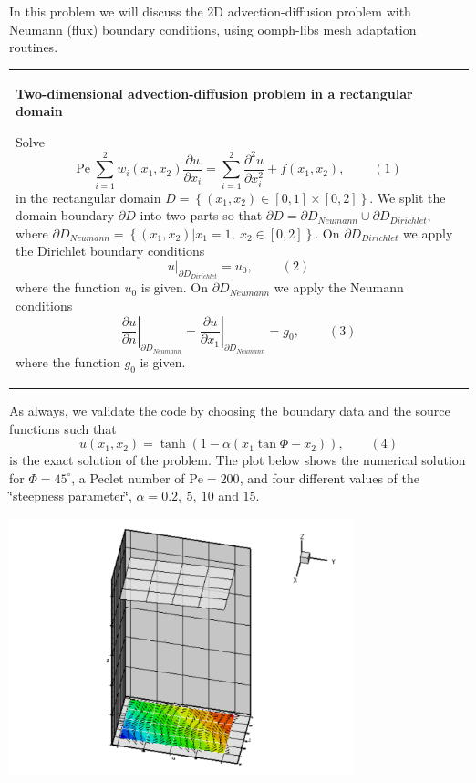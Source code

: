 In this problem we will discuss the 2D advection-\/diffusion problem with Neumann (flux) boundary conditions, using {\ttfamily oomph-\/lib\textquotesingle{}s} mesh adaptation routines.

\begin{center} \tabulinesep=1mm
\begin{longtabu} spread 0pt [c]{*{1}{|X[-1]}|}
\hline
\begin{center} {\bfseries Two-\/dimensional advection-\/diffusion problem in a rectangular domain} \end{center}  Solve \[ \mbox{Pe}\ \sum_{i=1}^2 w_i \left(x_1,x_2 \right) \frac{\partial u}{\partial x_i} = \sum_{i=1}^2 \frac{\partial^2u}{\partial x_i^2} + f(x_1,x_2), \ \ \ \ \ \ \ \ \ \ (1) \] in the rectangular domain $D =\left\{ (x_1,x_2) \in [0,1] \times [0,2]\right\}$. We split the domain boundary $ \partial D $ into two parts so that $ \partial D = \partial D_{Neumann} \cup \partial D_{Dirichlet} $, where $ \partial D_{Neumann} = \left\{ (x_1,x_2) | x_1=1, \ x_2\in [0,2] \right\} $. On $ \partial D_{Dirichlet}$ we apply the Dirichlet boundary conditions \[ \left. u\right|_{\partial D_{Dirichlet}}=u_0, \ \ \ \ \ \ \ \ \ \ (2) \] where the function $ u_0 $ is given. On $ \partial D_{Neumann}$ we apply the Neumann conditions \[ \left. \frac{\partial u}{\partial n}\right|_{\partial D_{Neumann}} = \left. \frac{\partial u}{\partial x_1}\right|_{\partial D_{Neumann}} =g_0, \ \ \ \ \ \ \ \ \ \ (3) \] where the function $ g_0 $ is given.   \\
\end{longtabu}
\end{center} 

As always, we validate the code by choosing the boundary data and the source functions such that \[ u(x_1,x_2) = \tanh(1-\alpha(x_1 \tan\Phi - x_2)), \ \ \ \ \ \ \ \ \ (4) \] is the exact solution of the problem. The plot below shows the numerical solution for $\Phi=45^\circ $, a Peclet number of $\mbox{Pe}= 200 $, and four different values of the \char`\"{}steepness parameter\char`\"{}, $ \alpha = 0.2,\ 5,\ 10 $ and $ 15 $.

 
\begin{DoxyImage}
\includegraphics[width=0.75\textwidth]{step_soln}
\end{DoxyImage}


